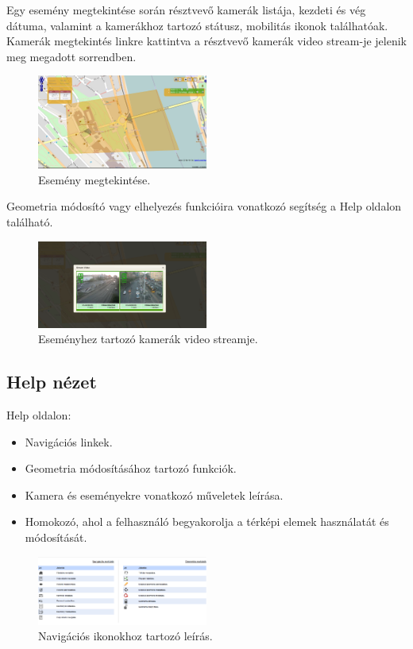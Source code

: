 Egy esemény megtekintése során résztvevő kamerák listája, kezdeti és vég dátuma, valamint a kamerákhoz tartozó státusz, mobilitás ikonok találhatóak.
Kamerák megtekintés linkre kattintva a résztvevő kamerák video stream-je jelenik meg megadott sorrendben.

\begin{figure}[h!]
  \centering
  \includegraphics[width=0.5\textwidth]{chapters/chap4/scenario_view.png}
  \caption{Esemény megtekintése.}
\end{figure}

Geometria módosító vagy elhelyezés funkcióira vonatkozó segítség a Help oldalon található.

\begin{figure}[h!]
  \centering
  \includegraphics[width=0.5\textwidth]{chapters/chap4/scenario_cams.png}
  \caption{Eseményhez tartozó kamerák video streamje.}
\end{figure}



\subsection{Help nézet} %
\label{sub:help_nézet}
Help oldalon:
\begin{itemize}
  \item Navigációs linkek.
  \item Geometria módosításához tartozó funkciók.
  \item Kamera és eseményekre vonatkozó műveletek leírása.
  \item Homokozó, ahol a felhasználó begyakorolja a térképi elemek használatát és módosítását.
\end{itemize}

\begin{figure}[h!]
  \centering
  \includegraphics[width=0.5\textwidth]{chapters/chap4/help_geom.png}
  \caption{Navigációs ikonokhoz tartozó leírás.}
\end{figure}


